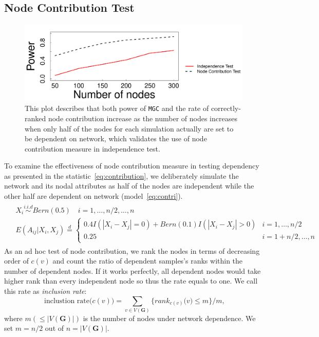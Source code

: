 \documentclass[11pt]{article}
\theoremstyle{definition}
\begin{document}
\subsection{Node Contribution Test}
\label{ssec:node}
\begin{figure}[ht]
	\centering
	\includegraphics[width=0.7\linewidth]{nodecontri.pdf}
	\caption{This plot describes that both power of \texttt{MGC} and the rate of correctly-ranked node contribution increase as the number of nodes increases when only half of the nodes for each simulation actually are set to be dependent on network, which validates the use of node contribution measure in independence test.}
	\label{fig:contribution}
\end{figure}
To examine the effectiveness of node contribution measure in testing dependency as presented in the statistic~\ref{eq:contribution}, we deliberately simulate the network and its nodal attributes as half of the nodes are independent while the other half are dependent on network (model~\ref{eq:contri}). 
\begin{equation}
\begin{gathered}
\begin{aligned}
	& X_{i} \overset{i.i.d}{\sim}  Bern(0.5)  \quad i = 1, \ldots ,n/2, \ldots, n \\
	& E( A_{ij} | X_{i}, X_{j} )   \stackrel{d}{=} \left\{  \begin{array}{cc} 0.4 I(|X_{i} - X_{j}| = 0)  + Bern(0.1) I(|X_{i} - X_{j}| > 0) & i = 1,\ldots,n/2 \\   0.25  & i=1+n/2, \ldots, n  \end{array} \right.
	\end{aligned}
	\end{gathered}
\label{eq:contri}
\end{equation}
As an ad hoc test of node contribution, we rank the nodes in terms of decreasing order of $c(v)$ and count the ratio of dependent samples's ranks within the number of dependent nodes. If it works perfectly, all dependent nodes would take higher rank than every independent node so thus the rate equals to one. We call this rate as \textit{inclusion rate}:
\begin{equation}
\mbox{ inclustion rate}\big(  c(v) \big) = \sum\limits_{v \in V(\mathbf{G})} \big\{  rank_{c(v)}\big(  v \big)  \leq  m  \big\}   /  m,
\label{eq:inclusion_rate}
\end{equation}
where $m (\leq |V(\mathbf{G})|)$ is the number of nodes under network dependence. We set $m=n/2$ out of $n = |V(\mathbf{G})|$.
\end{document}
